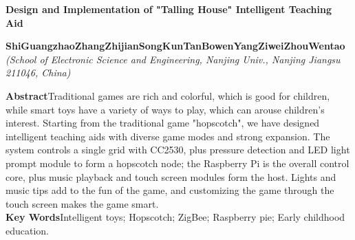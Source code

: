 \vspace{.1cm}
\begin{center}
\parbox{\textwidth}{
{\large{\textbf{Design and Implementation of "Talling House" Intelligent Teaching Aid}}}\\
\vspace{-0.5cm}
\begin{center}
\textbf{ShiGuangzhao\quad ZhangZhijian\quad SongKun\quad TanBowen\quad YangZiwei\quad ZhouWentao}\\[2pt]
\small{\textit{(School of Electronic Science and Engineering, Nanjing Univ., Nanjing Jiangsu 211046, China)}}\\[2pt]
\end{center}
{\small{\textbf{Abstract}\quad Traditional games are rich and colorful, which is good for children, while smart toys have a variety of ways to play, which can arouse children's interest. Starting from the traditional game "hopscotch", we have designed intelligent teaching aids with diverse game modes and strong expansion. The system controls a single grid with CC2530, plus pressure detection and LED light prompt module to form a hopscotch node; the Raspberry Pi is the overall control core, plus music playback and touch screen modules form the host. Lights and music tips add to the fun of the game, and customizing the game through the touch screen makes the game smart. \\
\textbf{Key Words}\quad Intelligent toys; Hopscotch; ZigBee; Raspberry pie; Early childhood education.}}
}
\end{center}



\setlength{\oddsidemargin}{-.5cm}  %
\setlength{\evensidemargin}{\oddsidemargin}
\setlength{\textwidth}{17.00cm}


